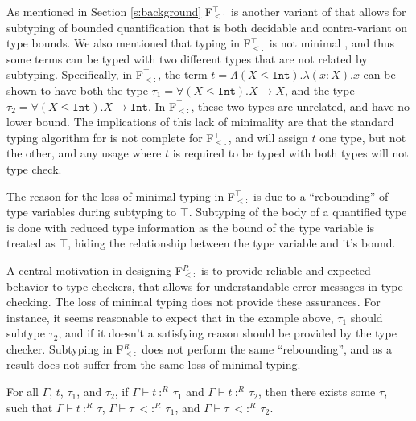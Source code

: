 \documentclass[runningheads, anon]{llncs}
\begin{document}
As mentioned in Section \ref{s:background} F$_{<:}^\top$ \cite{10.1145/174675.177844} is another variant of \Fsub that allows for 
subtyping of bounded quantification that is both decidable and contra-variant on type bounds. We also mentioned 
that typing in F$_{<:}^\top$ is not minimal \cite{10.1145/199448.199539}, and thus some terms can be typed with two different types that are not
related by subtyping. Specifically, in F$_{<:}^\top$, the term $t = \Lambda (X \leqslant \texttt{Int}).\lambda(x : X).x$
can be shown to have both the type $\tau_1 = \forall(X \leqslant \texttt{Int}).X \rightarrow X$, and the type
$\tau_2 = \forall(X \leqslant \texttt{Int}).X \rightarrow \texttt{Int}$. In F$_{<:}^\top$, these two types are unrelated, and have 
no lower bound. The implications of this lack of minimality are that the standard typing  algorithm for \Fsub is not complete
for F$_{<:}^\top$, and will assign $t$ one type, but not the other, and any usage where $t$ is required to be typed with
both types will not type check.

The reason for the loss of minimal typing in F$_{<:}^\top$ is due to a ``rebounding'' of type variables during subtyping 
to $\top$. Subtyping of the body of a quantified type is done with reduced type information as the bound of the 
type variable is treated as $\top$, hiding the relationship between the type variable and it's bound.

A central motivation in designing F$_{<:}^R$ is to provide reliable and expected behavior to type checkers, that allows for understandable
error messages in type checking. The loss of minimal typing does not provide these assurances. For instance, it seems reasonable to 
expect that in the example above, $\tau_1$ should subtype $\tau_2$, and if it doesn't a satisfying reason should be 
provided by the type checker. Subtyping in F$_{<:}^R$ does not perform the same ``rebounding'', and as a result does 
not suffer from the same loss of minimal typing.

\begin{theorem}
For all $\Gamma$, $t$, $\tau_1$, and $\tau_2$, if $\Gamma \vdash t\ :^R\ \tau_1$ and $\Gamma \vdash t\ :^R\ \tau_2$, 
then there exists some $\tau$, such that  $\Gamma \vdash t\ :^R\ \tau$, $\Gamma \vdash \tau\ <:^R\ \tau_1$, and 
$\Gamma \vdash \tau\ <:^R\ \tau_2$.
\end{theorem}
\end{document}
